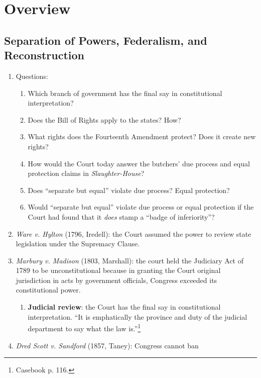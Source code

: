 \section{Overview}

\subsection{Separation of Powers, Federalism, and Reconstruction}

\begin{enumerate}
    \item Questions:
    \begin{enumerate}
        \item Which branch of government has the final say in constitutional 
        interpretation?
        \item Does the Bill of Rights apply to the states? How?
        \item What rights does the Fourteenth Amendment protect? Does it 
        create new rights?
        \item How would the Court today answer the butchers' due process and 
        equal protection claims in \emph{Slaughter-House}?
        \item Does ``separate but equal'' violate due process? Equal 
        protection?
        \item Would ``separate but equal'' violate due process or equal 
        protection if the Court had found that it \emph{does} stamp a ``badge 
        of inferiority''?
    \end{enumerate}
    \item \emph{Ware v. Hylton} (1796, Iredell): the Court assumed the power 
    to review state legislation under the Supremacy Clause.
    \item \emph{Marbury v. Madison} (1803, Marshall): the court held the 
    Judiciary Act of 1789 to be unconstitutional because in granting the Court 
    original jurisdiction in acts by government officials, Congress exceeded 
    its constitutional power.
    \begin{enumerate}
        \item \textbf{Judicial review}: the Court has the final say in 
        constitutional interpretation.  ``It is emphatically the province and 
        duty of the judicial department to say what the law 
        is.''\footnote{Casebook p. 116.}
    \end{enumerate}
    \item \emph{Dred Scott v. Sandford} (1857, Taney): Congress cannot ban 

\end{enumerate}

